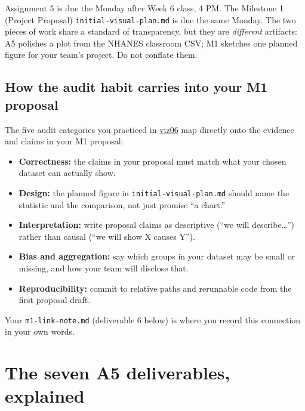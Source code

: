 \documentclass[
  letterpaper,
  DIV=11,
  numbers=noendperiod,
  oneside]{scrreprt}
\providecommand{\tightlist}{%
  \setlength{\itemsep}{0pt}\setlength{\parskip}{0pt}}
\begin{document}

Assignment 5 is due the Monday after Week 6 class, 4 PM. The Milestone 1
(Project Proposal) \texttt{initial-visual-plan.md} is due the same
Monday. The two pieces of work share a standard of transparency, but
they are \emph{different} artifacts: A5 polishes a plot from the NHANES
classroom CSV; M1 sketches one planned figure for your team's project.
Do not conflate them.

\subsection*{How the audit habit carries into your M1
proposal}\label{how-the-audit-habit-carries-into-your-m1-proposal}

The five audit categories you practiced in
\hyperref[in-class-studio-ai-visual-audit]{viz06} map directly onto the
evidence and claims in your M1 proposal:

\begin{itemize}
\tightlist
\item
  \textbf{Correctness:} the claims in your proposal must match what your
  chosen dataset can actually show.
\item
  \textbf{Design:} the planned figure in \texttt{initial-visual-plan.md}
  should name the statistic and the comparison, not just promise ``a
  chart.''
\item
  \textbf{Interpretation:} write proposal claims as descriptive (``we
  will describe\ldots{}'') rather than causal (``we will show X causes
  Y'').
\item
  \textbf{Bias and aggregation:} say which groups in your dataset may be
  small or missing, and how your team will disclose that.
\item
  \textbf{Reproducibility:} commit to relative paths and rerunnable code
  from the first proposal draft.
\end{itemize}

Your \texttt{m1-link-note.md} (deliverable 6 below) is where you record
this connection in your own words.

\section*{The seven A5 deliverables,
explained}\label{the-seven-a5-deliverables-explained}
\end{document}
